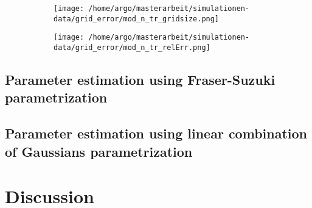 \documentclass{scrartcl}[12pt, halfparskip]
\begin{document}
\begin{figure}[H]
	\begin{subfigure}{0.49\textwidth}
		\texttt{[image: /home/argo/masterarbeit/simulationen-data/grid\_error/mod\_n\_tr\_gridsize.png]}
		\caption{}
		\label{fig:gridsize_mod_n_tr}
	\end{subfigure}
	\begin{subfigure}{0.49\textwidth}
		\texttt{[image: /home/argo/masterarbeit/simulationen-data/grid\_error/mod\_n\_tr\_relErr.png]}
		\caption{}
		\label{fig:grid_relErr_mod_n_tr}
	\end{subfigure}
\end{figure}



\subsection{Parameter estimation using Fraser-Suzuki parametrization}

\subsection{Parameter estimation using linear combination of Gaussians parametrization}



\section{Discussion}
\end{document}
